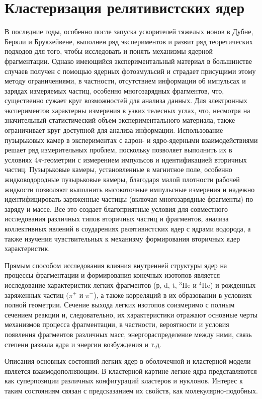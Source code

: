 \documentclass[fontsize=14pt]{scrreport}
\begin{document}
\section{Кластеризация релятивистских ядер}	
\hspace{0.6cm}
В последние годы, особенно после запуска ускорителей тяжелых ионов в Дубне, Беркли и Брукхейвене, выполнен ряд экспериментов и развит ряд теоретических подходов для того, чтобы исследовать и понять механизмы ядерной фрагментации. Однако имеющийся экспериментальный материал в большинстве случаев получен с помощью ядерных фотоэмульсий и страдает присущими этому методу ограничениями, в частности, отсутствием информации об импульсах и зарядах измеряемых частиц, особенно многозарядных фрагментов, что, существенно сужает круг возможностей для анализа данных. Для электронных экспериментов характерны измерения в узких телесных углах, что, несмотря на значительный статистический объем экспериментального материала, также ограничивает круг доступной для анализа информации. Использование пузырьковых камер в экспериментах с адрон- и ядро-ядерными взаимодействиями решает ряд измерительных проблем, поскольку позволяет выполнить их в условиях 4$\pi$-геометрии с измерением импульсов и идентификацией вторичных частиц. Пузырьковые камеры, установленные в магнитное поле, особенно жидководородные пузырьковые камеры, благодаря малой плотности рабочей жидкости позволяют выполнить высокоточные импульсные измерения и надежно идентифицировать заряженные частицы (включая многозарядные фрагменты) по заряду и массе. Все это создает благоприятные условия для совместного исследования различных типов вторичных частиц и фрагментов, анализа коллективных явлений в соударениях релятивистских ядер с ядрами водорода, а также изучения чувствительных к механизму формирования вторичных ядер характеристик. 

Прямым способом исследования влияния внутренней структуры ядер на процессы фрагментации и  формирования конечных изотопов является исследование характеристик легких фрагментов (р, d, t, $^{3}$He и $^{4}$He) и рожденных заряженных частиц ($\pi^{+}$ и $\pi^{-}$), а также корреляций в их образовании в условиях полной геометрии. Сечение выхода легких изотопов соизмеримо с полным сечением реакции и, следовательно, их характеристики отражают основные черты механизмов процесса фрагментации, в частности, вероятности и условия появления фрагментов различных масс, энергораспределение между ними, связь степени развала ядра и энергии возбуждения и т.д.

 Описания основных состояний легких ядер в оболочечной и кластерной модели является взаимодополняющим. В кластерной картине легкие ядра представляются как суперпозиции различных конфигураций кластеров и нуклонов. Интерес к таким состояниям связан с предсказанием их свойств, как молекулярно-подобных\cite{1,2}.
	
\end{document}
